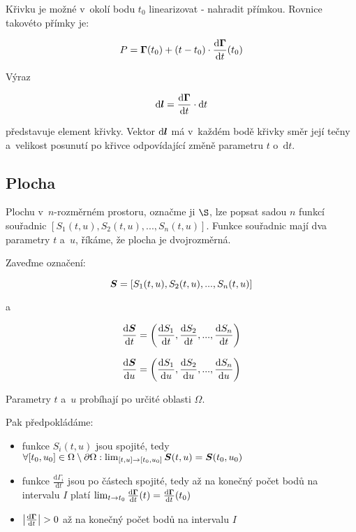 Křivku je možné v~okolí bodu \(t_0\) linearizovat - nahradit přímkou. Rovnice takovéto přímky je:

\begin{equation}
P = \boldsymbol{\Gamma}(t_0) + (t - t_0) \cdot \frac{\mathrm{d}\boldsymbol{\Gamma}}{\mathrm{d}t}(t_0)
\end{equation}

Výraz 

\begin{equation}
\mathrm{d}\boldsymbol{l} = \frac{\mathrm{d}\boldsymbol{\Gamma}}{\mathrm{d}t} \cdot \mathrm{d}t 
\end{equation}

představuje element křivky. Vektor \(\mathrm{d}\boldsymbol{l}\) má v~každém bodě křivky směr její tečny a~velikost posunutí po křivce odpovídající změně parametru \(t\) o~\(\mathrm{d}t\).

\subsection{Plocha}

Plochu v~\(n\)-rozměrném prostoru, označme ji \(\S\), lze popsat sadou \(n\) funkcí souřadnic \([S_1(t, u), S_2(t, u), ..., S_n(t, u)]\). Funkce souřadnic mají dva parametry \(t\) a~\(u\), říkáme, že plocha je dvojrozměrná.

Zaveďme označení:

\begin{equation}
\boldsymbol{S} = [S_1(t, u), S_2(t, u), ..., S_n(t, u)]
\end{equation}

a

\begin{equation}
\frac{\mathrm{d}\boldsymbol{S}}{\mathrm{d}t} = \left(\frac{\mathrm{d}S_1}{\mathrm{d}t}, \frac{\mathrm{d}S_2}{\mathrm{d}t}, ..., \frac{\mathrm{d}S_n}{\mathrm{d}t} \right)
\end{equation}

\begin{equation}
\frac{\mathrm{d}\boldsymbol{S}}{\mathrm{d}u} = \left(\frac{\mathrm{d}S_1}{\mathrm{d}u}, \frac{\mathrm{d}S_2}{\mathrm{d}u}, ..., \frac{\mathrm{d}S_n}{\mathrm{d}u} \right)
\end{equation}

Parametry \(t\) a~\(u\) probíhají po určité oblasti \(\Omega\).

Pak předpokládáme:

\begin{itemize}
\item funkce \(S_i(t, u)\) jsou spojité, tedy \(\forall [t_0, u_0] \in \Omega \setminus \partial \Omega: \lim_{[t, u] \to [t_0, u_0]} \boldsymbol{S}(t, u) = \boldsymbol{S}(t_0, u_0)\)
\item funkce \(\frac{\mathrm{d}\Gamma_i}{\mathrm{d}t}\) jsou po částech spojité, tedy až na konečný počet bodů na intervalu \(I\) platí \(\lim_{t \to t_0} \frac{\mathrm{d}\boldsymbol{\Gamma}}{\mathrm{d}t}(t) = \frac{\mathrm{d}\boldsymbol{\Gamma}}{\mathrm{d}t}(t_0)\)
\item \(\left|\frac{\mathrm{d}\boldsymbol{\Gamma}}{\mathrm{d}t} \right| > 0\) až na konečný počet bodů na intervalu \(I\)
\end{itemize}



